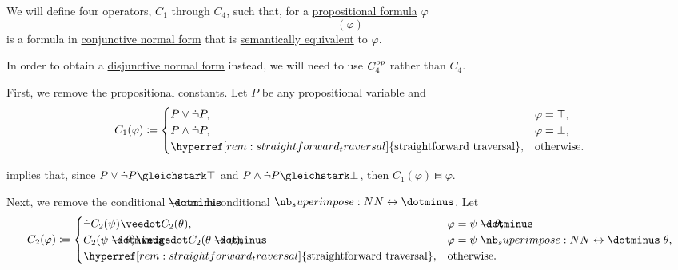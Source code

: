 \begin{algorithm}\label{alg:cnf_and_dnf}
  We will define four operators, \( C_1 \) through \( C_4 \), such that, for a \hyperref[def:propositional_syntax/formula]{propositional formula} \( \varphi \)
  \begin{equation*}
    [C_4 \bincirc C_3 \bincirc C_2 \bincirc C_1](\varphi)
  \end{equation*}
  is a formula in \hyperref[def:cnf_and_dnf]{conjunctive normal form} that is \hyperref[def:propositional_entailment/equivalence]{semantically equivalent} to \( \varphi \).

  In order to obtain a \hyperref[def:cnf_and_dnf]{disjunctive normal form} instead, we will need to use \( C_4^{op} \) rather than \( C_4 \).

  \begin{thmenum}
     First, we remove the propositional constants. Let \( P \) be any propositional variable and
    \begin{equation*}
      C_1(\varphi) \coloneqq \begin{cases}
        P \vee \synneg P,                                                        &\varphi = \top, \\
        P \wedge \synneg P,                                                      &\varphi = \bot, \\
        \hyperref[rem:straightforward_traversal]{\T{straightforward traversal}}, &\T{otherwise.}
      \end{cases}
    \end{equation*}

     implies that, since \( P \vee \synneg P \gleichstark \top \) and \( P \wedge \synneg P \gleichstark \bot \), then \( C_1(\varphi) \gleichstark \varphi \).

     Next, we remove the conditional \( \synimplies \) and biconditional \( \syniff \). Let
    \begin{equation*}
      C_2(\varphi) \coloneqq \begin{cases}
        \synneg C_2(\psi) \synvee C_2(\theta),                                   &\varphi = \psi \synimplies \theta, \\
        C_2(\psi \synimplies \theta) \synwedge C_2(\theta \synimplies \psi),     &\varphi = \psi \syniff \theta, \\
        \hyperref[rem:straightforward_traversal]{\T{straightforward traversal}}, &\T{otherwise.}
      \end{cases}
    \end{equation*}


\end{thmenum}
\end{algorithm}
